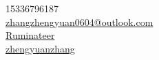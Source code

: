 \hfill
\begin{minipage}{0.3\textwidth}
    \begin{small}
        \faPhone\ 15336796187 \\
        \faEnvelopeO\ \href{mailto: zhangzhengyuan0604@outlook.com}{zhangzhengyuan0604@outlook.com} \\
        \faGithub\ \href{https://github.com/Ruminateer}{Ruminateer} \\
        \faLinkedin\ \href{https://www.linkedin.com/in/zhengyuanzhang/}{zhengyuanzhang}
    \end{small}
\end{minipage}
